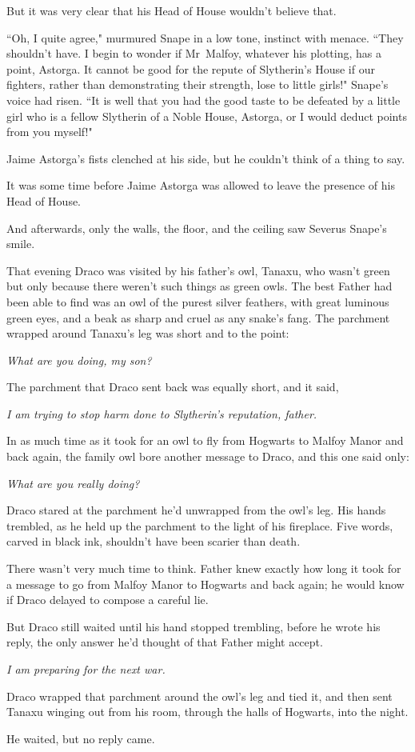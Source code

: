 But it was very clear that his Head of House wouldn't believe that.

``Oh, I quite agree," murmured Snape in a low tone, instinct with menace. ``They shouldn't have. I begin to wonder if Mr~Malfoy, whatever his plotting, has a point, Astorga. It cannot be good for the repute of Slytherin's House if our fighters, rather than demonstrating their strength, lose to little girls!" Snape's voice had risen. ``It is well that you had the good taste to be defeated by a little girl who is a fellow Slytherin of a Noble House, Astorga, or I would deduct points from you myself!"

Jaime Astorga's fists clenched at his side, but he couldn't think of a thing to say.

It was some time before Jaime Astorga was allowed to leave the presence of his Head of House.

And afterwards, only the walls, the floor, and the ceiling saw Severus Snape's smile.

\later

That evening Draco was visited by his father's owl, Tanaxu, who wasn't green but only because there weren't such things as green owls. The best Father had been able to find was an owl of the purest silver feathers, with great luminous green eyes, and a beak as sharp and cruel as any snake's fang. The parchment wrapped around Tanaxu's leg was short and to the point:

\emph{What are you doing, my son?}

The parchment that Draco sent back was equally short, and it said,

\emph{I am trying to stop harm done to Slytherin's reputation, father.}

In as much time as it took for an owl to fly from Hogwarts to Malfoy Manor and back again, the family owl bore another message to Draco, and this one said only:

\emph{What are you really doing?}

Draco stared at the parchment he'd unwrapped from the owl's leg. His hands trembled, as he held up the parchment to the light of his fireplace. Five words, carved in black ink, shouldn't have been scarier than death.

There wasn't very much time to think. Father knew exactly how long it took for a message to go from Malfoy Manor to Hogwarts and back again; he would know if Draco delayed to compose a careful lie.

But Draco still waited until his hand stopped trembling, before he wrote his reply, the only answer he'd thought of that Father might accept.

\emph{I am preparing for the next war.}

Draco wrapped that parchment around the owl's leg and tied it, and then sent Tanaxu winging out from his room, through the halls of Hogwarts, into the night.

He waited, but no reply came.

